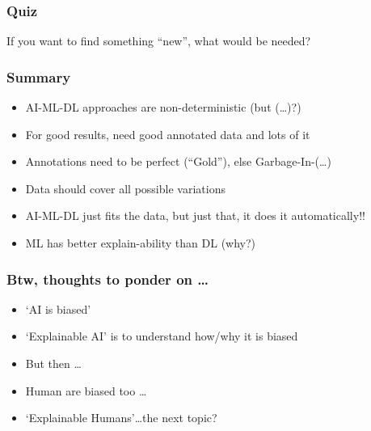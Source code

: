 \begin{frame}[fragile]\frametitle{Quiz}
If you want to find something ``new'', what would be needed?
\end{frame}

\begin{frame}[fragile]\frametitle{Summary}
\begin{itemize}
\item AI-ML-DL approaches are non-deterministic (but (\ldots)?)
\item For good results, need good annotated data and lots of it
\item Annotations need to be perfect (``Gold''), else Garbage-In-(\ldots)
\item Data should cover all possible variations
\item AI-ML-DL just fits the data, but just that, it does it automatically!!
\item ML has better explain-ability than DL (why?)
\end{itemize}
\end{frame}

\begin{frame}[fragile]\frametitle{Btw, thoughts to ponder on \ldots}
\begin{itemize}
\item ‘AI is biased'
\item ‘Explainable AI' is to understand how/why it is biased
\item But then \ldots
\item Human are biased too \ldots
\item ‘Explainable Humans'\ldots the next topic?
\end{itemize}
\end{frame}
